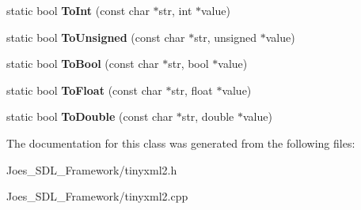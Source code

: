 \begin{DoxyCompactItemize}
\item 
\hypertarget{classtinyxml2_1_1_x_m_l_util_ad4df4023d11ee3fca9689c49b9707323}{static bool {\bfseries To\-Int} (const char $\ast$str, int $\ast$value)}\label{classtinyxml2_1_1_x_m_l_util_ad4df4023d11ee3fca9689c49b9707323}

\item 
\hypertarget{classtinyxml2_1_1_x_m_l_util_a210c8637d5eb4ce3d4625294af0efc2f}{static bool {\bfseries To\-Unsigned} (const char $\ast$str, unsigned $\ast$value)}\label{classtinyxml2_1_1_x_m_l_util_a210c8637d5eb4ce3d4625294af0efc2f}

\item 
\hypertarget{classtinyxml2_1_1_x_m_l_util_ae5b03e0a1ca5d42052a7ac540f7aa12a}{static bool {\bfseries To\-Bool} (const char $\ast$str, bool $\ast$value)}\label{classtinyxml2_1_1_x_m_l_util_ae5b03e0a1ca5d42052a7ac540f7aa12a}

\item 
\hypertarget{classtinyxml2_1_1_x_m_l_util_a399e71edb5f29d61ea81d91ee0332bb9}{static bool {\bfseries To\-Float} (const char $\ast$str, float $\ast$value)}\label{classtinyxml2_1_1_x_m_l_util_a399e71edb5f29d61ea81d91ee0332bb9}

\item 
\hypertarget{classtinyxml2_1_1_x_m_l_util_ad8f75ac140fb19c1c6e164a957c4cd53}{static bool {\bfseries To\-Double} (const char $\ast$str, double $\ast$value)}\label{classtinyxml2_1_1_x_m_l_util_ad8f75ac140fb19c1c6e164a957c4cd53}

\end{DoxyCompactItemize}


The documentation for this class was generated from the following files\-:\begin{DoxyCompactItemize}
\item 
Joes\-\_\-\-S\-D\-L\-\_\-\-Framework/tinyxml2.\-h\item 
Joes\-\_\-\-S\-D\-L\-\_\-\-Framework/tinyxml2.\-cpp\end{DoxyCompactItemize}
